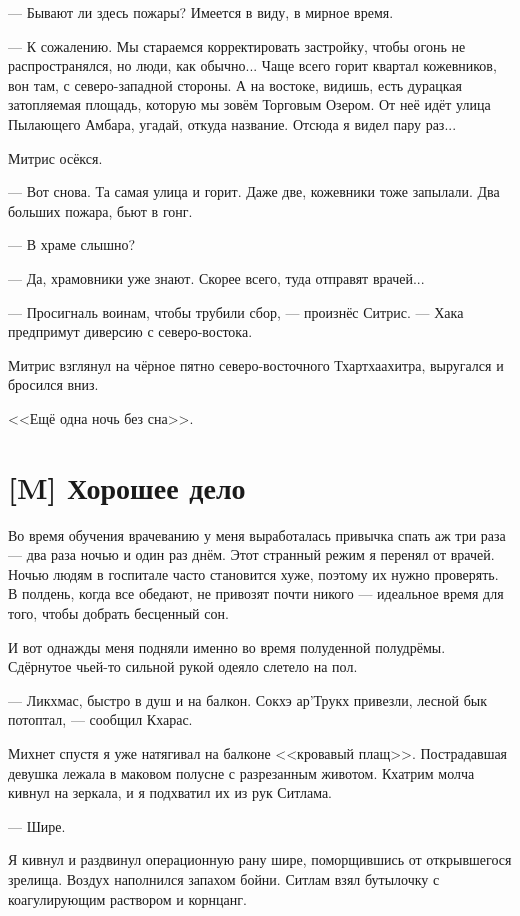 --- Бывают ли здесь пожары?
Имеется в виду, в мирное время.

--- К сожалению.
Мы стараемся корректировать застройку, чтобы огонь не распространялся, но люди, как обычно...
Чаще всего горит квартал кожевников, вон там, с северо-западной стороны.
А на востоке, видишь, есть дурацкая затопляемая площадь, которую мы зовём Торговым Озером.
От неё идёт улица Пылающего Амбара, угадай, откуда название.
Отсюда я видел пару раз...

Митрис осёкся.

--- Вот снова.
Та самая улица и горит.
Даже две, кожевники тоже запылали.
Два больших пожара, бьют в гонг.

--- В храме слышно?

--- Да, храмовники уже знают.
Скорее всего, туда отправят врачей...

--- Просигналь воинам, чтобы трубили сбор, --- произнёс Ситрис.
--- Хака предпримут диверсию с северо-востока.

Митрис взглянул на чёрное пятно северо-восточного Тхартхаахитра, выругался и бросился вниз.

<<Ещё одна ночь без сна>>.

\section{[M] Хорошее дело}

Во время обучения врачеванию у меня выработалась привычка спать аж три раза --- два раза ночью и один раз днём.
Этот странный режим я перенял от врачей.
Ночью людям в госпитале часто становится хуже, поэтому их нужно проверять.
В полдень, когда все обедают, не привозят почти никого --- идеальное время для того, чтобы добрать бесценный сон.

И вот однажды меня подняли именно во время полуденной полудрёмы.
Сдёрнутое чьей-то сильной рукой одеяло слетело на пол.

--- Ликхмас, быстро в душ и на балкон.
Сокхэ ар’Трукх привезли, лесной бык потоптал, --- сообщил Кхарас.

Михнет спустя я уже натягивал на балконе <<кровавый плащ>>.
Пострадавшая девушка лежала в маковом полусне с разрезанным животом.
Кхатрим молча кивнул на зеркала, и я подхватил их из рук Ситлама.

--- Шире.

Я кивнул и раздвинул операционную рану шире, поморщившись от открывшегося зрелища.
Воздух наполнился запахом бойни.
Ситлам взял бутылочку с коагулирующим раствором и корнцанг.

